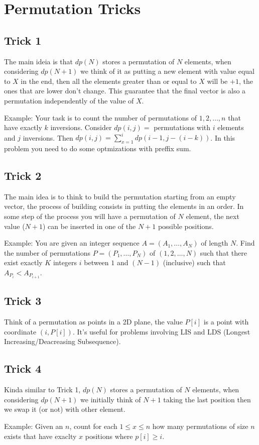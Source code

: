 \section{Permutation Tricks}

\subsection{Trick 1}

The main ideia is that $dp(N)$ stores a permutation of $N$ elements, when considering $dp(N+1)$ we 
think of it as putting a new element with value equal to $X$ in the end, then all the elements greater 
than or equal to $X$ will be $+1$, the ones that are lower don't change. This guarantee that the final 
vector is also a permutation independently of the value of $X$.

Example: Your task is to count the number of permutations of $1,2, \ldots ,n$ that have exactly $k$ inversions. Consider $dp(i,j) =$ permutations with $i$ elements and $j$ inversions. Then $dp(i,j) =  \sum_{x = 1}^{i} dp(i-1,j-(i-k))$. In this problem you need to do some optmizations with preffix sum.

\subsection{Trick 2}

The main idea is to think to build the permutation starting from an empty vector, the process of building consists in putting the elements in an order. In some step of the process you will have a permutation of $N$ element, the next value ($N+1$) can be inserted in one of the $N+1$ possible positions.

Example: You are given an integer sequence $A = (A_1,\dots,A_N)$ of length $N$. Find the number of permutations $P = (P_1,\dots,P_N)$ of $(1,2,\dots,N)$ such that there exist exactly $K$ integers $i$ between $1$ and $(N-1)$ (inclusive) such that $A_{P_i} < A_{P_{i+1}}$.

\subsection{Trick 3}

Think of a permutation as points in a 2D plane, the value $P[i]$ is a point with coordinate $(i,P[i])$. It's useful for problems involving LIS and LDS (Longest Increasing/Deacreasing Subsequence).

\subsection{Trick 4}

Kinda similar to Trick 1, $dp(N)$ stores a permutation of $N$ elements, when considering $dp(N+1)$ we initially think of $N+1$ taking the last position then we swap it (or not) with other element.

Example: Given an $n$, count for each $1 \leq x \leq n$ how many permutations of size $n$ exists that have exaclty $x$ positions where $p[i] \geq i$.
